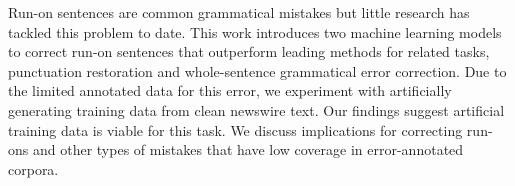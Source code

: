 Run-on sentences are common grammatical mistakes but little research has tackled this problem to date.  This work introduces two machine learning models to correct run-on sentences that outperform leading methods for related tasks, punctuation restoration and whole-sentence grammatical error correction. Due to the limited annotated data for this error, we experiment with artificially generating training data from clean newswire text. Our findings suggest artificial training data is viable for this task. We discuss implications for correcting run-ons and other types of mistakes that have low coverage in error-annotated corpora.
